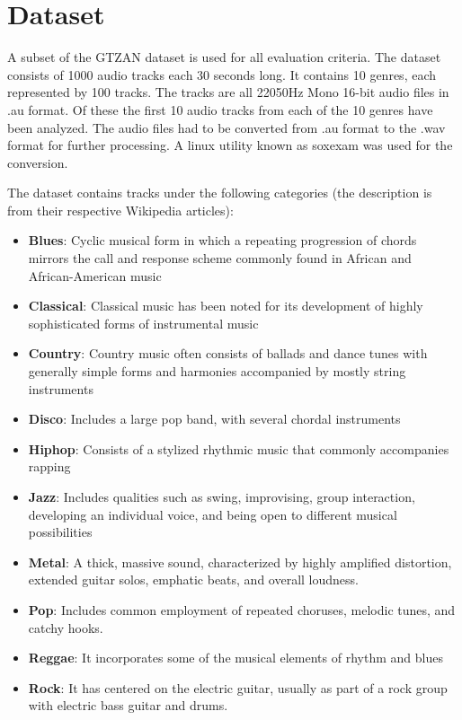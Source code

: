 \documentclass[12pt,journal,compsoc]{IEEEtran}
\begin{document}
\section{Dataset}
A subset of the GTZAN dataset \cite{gtzan} is used for all evaluation criteria. The dataset consists of 1000 audio tracks each 30 seconds long. It contains 10 genres, each represented by 100 tracks. The tracks are all 22050Hz Mono 16-bit audio files in .au format. Of these the first 10 audio tracks from each of the 10 genres have been analyzed. The audio files had to be converted from .au format to the .wav format for further processing. A linux utility known as soxexam was used for the conversion.

The dataset contains tracks under the following categories (the description is from their respective Wikipedia articles):
\begin{itemize}
\item \textbf{Blues}: Cyclic musical form in which a repeating progression of chords mirrors the call and response scheme commonly found in African and African-American music \cite{blues}
\item \textbf{Classical}: Classical music has been noted for its development of highly sophisticated forms of instrumental music \cite{classical}
\item \textbf{Country}: Country music often consists of ballads and dance tunes with generally simple forms and harmonies accompanied by mostly string instruments \cite{country}
\item \textbf{Disco}: Includes a large pop band, with several chordal instruments \cite{disco}
\item \textbf{Hiphop}: Consists of a stylized rhythmic music that commonly accompanies rapping \cite{hiphop}
\item \textbf{Jazz}: Includes qualities such as swing, improvising, group interaction, developing an individual voice, and being open to different musical possibilities \cite{jazz}
\item \textbf{Metal}: A thick, massive sound, characterized by highly amplified distortion, extended guitar solos, emphatic beats, and overall loudness. \cite{metal}
\item \textbf{Pop}: Includes common employment of repeated choruses, melodic tunes, and catchy hooks. \cite{pop}
\item \textbf{Reggae}: It incorporates some of the musical elements of rhythm and blues \cite{reggae}
\item \textbf{Rock}: It has centered on the electric guitar, usually as part of a rock group with electric bass guitar and drums.\cite{rock}
\end{itemize}
\end{document}
